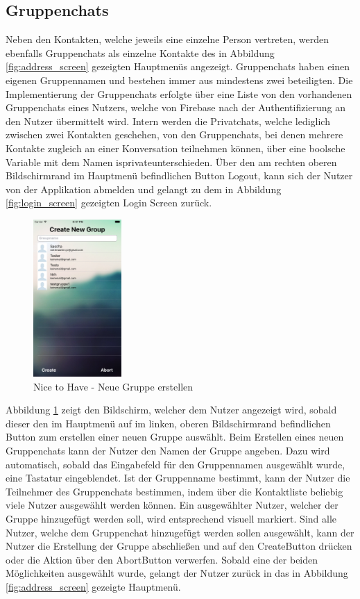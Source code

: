 \subsection{Gruppenchats}
Neben den Kontakten, welche jeweils eine einzelne Person vertreten, werden ebenfalls Gruppenchats als einzelne Kontakte des in Abbildung \ref{fig:address_screen} gezeigten Hauptmenüs angezeigt. Gruppenchats haben einen eigenen Gruppennamen und bestehen immer aus mindestens zwei beteiligten. Die Implementierung der Gruppenchats erfolgte über eine Liste von den vorhandenen Gruppenchats eines Nutzers, welche von Firebase nach der Authentifizierung an den Nutzer übermittelt wird. Intern werden die Privatchats, welche lediglich zwischen zwei Kontakten geschehen, von den Gruppenchats, bei denen mehrere Kontakte zugleich an einer Konversation teilnehmen können, über eine boolsche Variable mit dem Namen \glqq isprivate\grqq{ }unterschieden.
Über den am rechten oberen Bildschirmrand im Hauptmenü befindlichen Button Logout, kann sich der Nutzer von der Applikation abmelden und gelangt zu dem in Abbildung \ref{fig:login_screen} gezeigten Login Screen zurück.
\newline
\newline
\begin{figure}[ht]
  \centering
    \includegraphics[width=0.3\textwidth]{images/creategroup_screen}
    \caption{Nice to Have - Neue Gruppe erstellen}
	 \label{fig:creategroup_screen}
\end{figure}
Abbildung \ref{fig:creategroup_screen} zeigt den Bildschirm, welcher dem Nutzer angezeigt wird, sobald dieser den im Hauptmenü auf im linken, oberen Bildschirmrand befindlichen Button zum erstellen einer neuen Gruppe auswählt. Beim Erstellen eines neuen Gruppenchats kann der Nutzer den Namen der Gruppe angeben. Dazu wird automatisch, sobald das Eingabefeld für den Gruppennamen ausgewählt wurde, eine Tastatur eingeblendet. Ist der Gruppenname bestimmt, kann der Nutzer die Teilnehmer des Gruppenchats bestimmen, indem über die Kontaktliste beliebig viele Nutzer ausgewählt werden können. Ein ausgewählter Nutzer, welcher der Gruppe hinzugefügt werden soll, wird entsprechend visuell markiert. Sind alle Nutzer, welche dem Gruppenchat hinzugefügt werden sollen ausgewählt, kann der Nutzer die Erstellung der Gruppe abschließen und auf den \glqq Create\grqq{-}Button drücken oder die Aktion über den \glqq Abort\grqq{-}Button verwerfen. Sobald eine der beiden Möglichkeiten ausgewählt wurde, gelangt der Nutzer zurück in das in Abbildung \ref{fig:address_screen} gezeigte Hauptmenü.
\newpage
